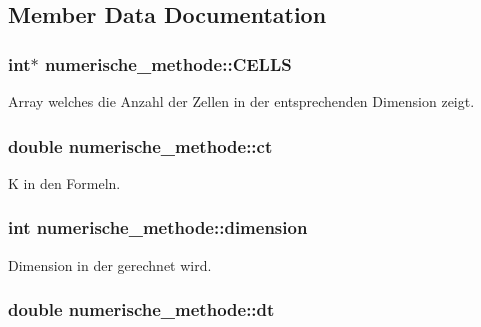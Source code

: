 \subsection{Member Data Documentation}
\hypertarget{classnumerische__methode_a896a9488a1b7593e4312fa102264c280}{
\subsubsection[{C\-E\-L\-L\-S}]{\setlength{\rightskip}{0pt plus 5cm}int$\ast$ numerische\-\_\-methode\-::\-C\-E\-L\-L\-S\hspace{0.3cm}{\ttfamily [protected]}}}\label{classnumerische__methode_a896a9488a1b7593e4312fa102264c280}
Array welches die Anzahl der Zellen in der entsprechenden Dimension zeigt. \hypertarget{classnumerische__methode_aec540b2a47bbc7318f511583087c5498}{
\subsubsection[{ct}]{\setlength{\rightskip}{0pt plus 5cm}double numerische\-\_\-methode\-::ct\hspace{0.3cm}{\ttfamily [protected]}}}\label{classnumerische__methode_aec540b2a47bbc7318f511583087c5498}
K in den Formeln. \hypertarget{classnumerische__methode_a5a52e194b395d083422d9b03e72d3d5f}{
\subsubsection[{dimension}]{\setlength{\rightskip}{0pt plus 5cm}int numerische\-\_\-methode\-::dimension\hspace{0.3cm}{\ttfamily [protected]}}}\label{classnumerische__methode_a5a52e194b395d083422d9b03e72d3d5f}
Dimension in der gerechnet wird. \hypertarget{classnumerische__methode_a073f2f281300eebad11d25e6a2e4a481}{
\subsubsection[{dt}]{\setlength{\rightskip}{0pt plus 5cm}double numerische\-\_\-methode\-::dt\hspace{0.3cm}{\ttfamily [protected]}}}\label{classnumerische__methode_a073f2f281300eebad11d25e6a2e4a481}
